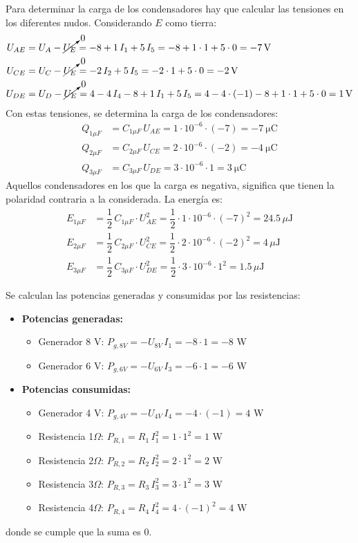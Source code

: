 Para determinar la carga de los condensadores hay que calcular las
tensiones en los diferentes nudos. Considerando $E$ como tierra:
\begin{align*}
  U_{AE}&=U_{A}-\cancelto{0}{U_{E}}=-8+1\,I_1+5\,I_5=-8+1\cdot 1 + 5\cdot 0=\qty{-7}{\volt}\\
  U_{CE}&=U_{C}-\cancelto{0}{U_{E}}=-2\,I_2+5\,I_5=-2\cdot 1+5\cdot 0 =\qty{-2}{\volt}\\
  U_{DE}&=U_{D}-\cancelto{0}{U_{E}}=4-4\, I_4-8+1\,I_1+5\,I_5=4-4\cdot (-1)-8+1\cdot 1 +5\cdot 0=\qty{1}{\volt}
\end{align*}
Con estas tensiones, se determina la carga de los condensadores:
\begin{align*}
  Q_{1\mu F}&=C_{1\mu F}\, U_{AE} = 1\cdot 10^{-6}\cdot (-7)=\qty{-7}{\micro\coulomb}\\
  Q_{2\mu F}&=C_{2\mu F}\, U_{CE} = 2\cdot 10^{-6}\cdot (-2)=\qty{-4}{\micro\coulomb}\\
  Q_{3\mu F}&=C_{3\mu F}\, U_{DE} = 3\cdot 10^{-6}\cdot 1=\qty{3}{\micro\coulomb}
\end{align*}
Aquellos condensadores en los que la carga es negativa, significa que
tienen la polaridad contraria a la considerada. La energía es:
\begin{align*}
  E_{1\mu F}&=\dfrac{1}{2}\,C_{1\mu F}\cdot U_{AE}^2 = \dfrac{1}{2}\cdot 1\cdot 10^{-6}\cdot (-7)^2=24.5\,\mu\text{J}\\
  E_{2\mu F}&=\dfrac{1}{2}\,C_{2\mu F}\cdot U_{CE}^2 = \dfrac{1}{2}\cdot 2\cdot 10^{-6}\cdot (-2)^2=4\,\mu\text{J}\\
  E_{3\mu F}&=\dfrac{1}{2}\,C_{3\mu F}\cdot U_{DE}^2 = \dfrac{1}{2}\cdot 3\cdot 10^{-6}\cdot 1^2=1.5\,\mu\text{J}
\end{align*}

Se calculan las potencias generadas y consumidas por las resistencias:
\begin{itemize}
\item \textbf{Potencias generadas:}
  \begin{itemize}
  \item Generador 8 V: $P_{g,8V}=-U_{8V}\,I_1=-8\cdot 1=-8$ W
  \item Generador 6 V: $P_{g,6V}=-U_{6V}\,I_3=-6\cdot 1=-6$ W
  \end{itemize}
\item \textbf{Potencias consumidas:}
  \begin{itemize}
  \item Generador 4 V: $P_{g,4V}=-U_{4V}\,I_4=-4\cdot (-1)=4$ W
  \item Resistencia 1$\Omega$: $P_{R,1}=R_1\,I_1^2=1\cdot 1^2=1$ W
  \item Resistencia 2$\Omega$: $P_{R,2}=R_2\,I_2^2=2\cdot 1^2=2$ W
  \item Resistencia 3$\Omega$: $P_{R,3}=R_3\,I_3^2=3\cdot 1^2=3$ W
  \item Resistencia 4$\Omega$: $P_{R,4}=R_4\,I_4^2=4\cdot (-1)^2=4$ W
  \end{itemize}
\end{itemize}
donde se cumple que la suma es 0.

